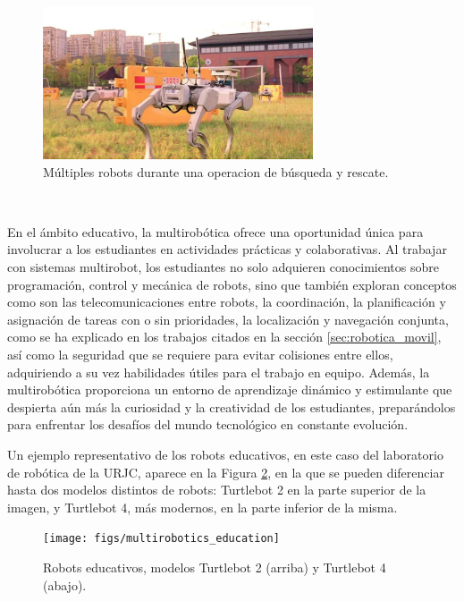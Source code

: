 \begin{figure} [h!]
  \begin{center}
    \includegraphics[width=8cm]{figs/multirobotics_in_search_and_rescue}
  \end{center}
  \caption{Múltiples robots durante una operacion de búsqueda y rescate.}
  \label{fig:multirobots}
\end{figure}\

En el ámbito educativo, la multirobótica ofrece una oportunidad única para
involucrar a los estudiantes en actividades prácticas y colaborativas.
Al trabajar con sistemas multirobot, los estudiantes no solo adquieren
conocimientos sobre programación, control y mecánica de robots, sino que también
exploran conceptos como son las telecomunicaciones entre robots, la coordinación,
la planificación y asignación de tareas con o sin prioridades, la localización y
navegación conjunta, como se ha explicado en los trabajos citados en la sección
\ref{sec:robotica_movil}, así como la seguridad que se requiere para evitar
colisiones entre ellos, adquiriendo a su vez habilidades útiles para el trabajo
en equipo.
Además, la multirobótica proporciona un entorno de aprendizaje dinámico y
estimulante que despierta aún más la curiosidad y la creatividad de los
estudiantes, preparándolos para enfrentar los desafíos del mundo tecnológico en
constante evolución.

Un ejemplo representativo de los robots educativos, en este caso del laboratorio
de robótica de la URJC, aparece en la Figura \ref{fig:robots_education}, en la
que se pueden diferenciar hasta dos modelos distintos de robots: Turtlebot 2 en
la parte superior de la imagen, y Turtlebot 4, más modernos, en la parte inferior
de la misma.

\begin{figure} [h!]
  \begin{center}
    \texttt{[image: figs/multirobotics\_education]}
  \end{center}
  \caption{Robots educativos, modelos Turtlebot 2 (arriba) y Turtlebot 4 (abajo).}
  \label{fig:robots_education}
\end{figure}\



